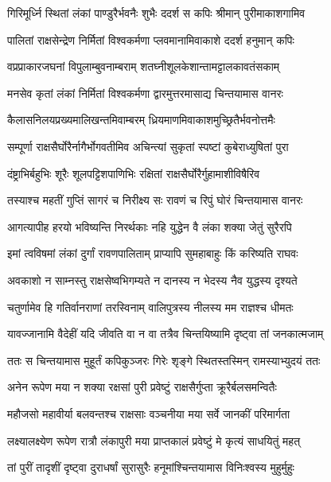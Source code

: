 \twolineshloka
{गिरिमूर्ध्नि स्थितां लंकां पाण्डुरैर्भवनैः शुभैः}
{ददर्श स कपिः श्रीमान् पुरीमाकाशगामिव} %

\twolineshloka
{पालितां राक्षसेन्द्रेण निर्मितां विश्वकर्मणा}
{प्लवमानामिवाकाशे ददर्श हनुमान् कपिः} %

\twolineshloka
{वप्रप्राकारजघनां विपुलाम्बुवनाम्बराम्}
{शतघ्नीशूलकेशान्तामट्टालकावतंसकाम्} %

\twolineshloka
{मनसेव कृतां लंकां निर्मितां विश्वकर्मणा}
{द्वारमुत्तरमासाद्य चिन्तयामास वानरः} %

\twolineshloka
{कैलासनिलयप्रख्यमालिखन्तमिवाम्बरम्}
{ध्रियमाणमिवाकाशमुच्छ्रितैर्भवनोत्तमैः} %

\twolineshloka
{सम्पूर्णा राक्षसैर्घोरैर्नागैर्भोगवतीमिव}
{अचिन्त्यां सुकृतां स्पष्टां कुबेराध्युषितां पुरा} %

\twolineshloka
{दंष्ट्राभिर्बहुभिः शूरैः शूलपट्टिशपाणिभिः}
{रक्षितां राक्षसैर्घोरैर्गुहामाशीविषैरिव} %

\twolineshloka
{तस्याश्च महतीं गुप्तिं सागरं च निरीक्ष्य सः}
{रावणं च रिपुं घोरं चिन्तयामास वानरः} %

\twolineshloka
{आगत्यापीह हरयो भविष्यन्ति निरर्थकाः}
{नहि युद्धेन वै लंका शक्या जेतुं सुरैरपि} %

\twolineshloka
{इमां त्वविषमां लंकां दुर्गां रावणपालिताम्}
{प्राप्यापि सुमहाबाहुः किं करिष्यति राघवः} %

\twolineshloka
{अवकाशो न साम्नस्तु राक्षसेष्वभिगम्यते}
{न दानस्य न भेदस्य नैव युद्धस्य दृश्यते} %

\twolineshloka
{चतुर्णामेव हि गतिर्वानराणां तरस्विनाम्}
{वालिपुत्रस्य नीलस्य मम राज्ञश्च धीमतः} %

\twolineshloka
{यावज्जानामि वैदेहीं यदि जीवति वा न वा}
{तत्रैव चिन्तयिष्यामि दृष्ट्वा तां जनकात्मजाम्} %

\twolineshloka
{ततः स चिन्तयामास मुहूर्तं कपिकुञ्जरः}
{गिरेः शृङ्गे स्थितस्तस्मिन् रामस्याभ्युदयं ततः} %

\twolineshloka
{अनेन रूपेण मया न शक्या रक्षसां पुरी}
{प्रवेष्टुं राक्षसैर्गुप्ता क्रूरैर्बलसमन्वितैः} %

\twolineshloka
{महौजसो महावीर्या बलवन्तश्च राक्षसाः}
{वञ्चनीया मया सर्वे जानकीं परिमार्गता} %

\twolineshloka
{लक्ष्यालक्ष्येण रूपेण रात्रौ लंकापुरी मया}
{प्राप्तकालं प्रवेष्टुं मे कृत्यं साधयितुं महत्} %

\twolineshloka
{तां पुरीं तादृशीं दृष्ट्वा दुराधर्षां सुरासुरैः}
{हनूमांश्चिन्तयामास विनिःश्वस्य मुहुर्मुहुः} %

